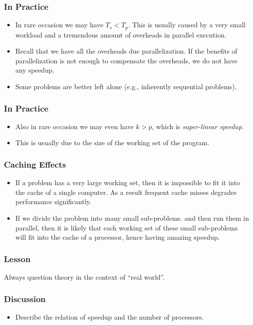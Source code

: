 \documentclass{beamer}
\begin{document}
\begin{CJK}{UTF8}{bsmi}
\begin{frame}
\frametitle{In Practice}
\begin{itemize}
\item In rare occasion we may have $T_s < T_p$.  This is usually
  caused by a very small workload and a tremendous amount of overheads in
  parallel execution.
\item Recall that we have all the overheads due parallelization.  If
  the benefits of parallelization is not enough to compensate the
  overheads, we do not have any speedup.
\item Some problems are better left alone (e.g., inherently sequential
  problems).
\end{itemize}
\end{frame}

\begin{frame}
\frametitle{In Practice}
\begin{itemize}
\item Also in rare occasion we may even have $k > p$, which is {\em
  super-linear speedup}.  
\item This is usually due to the size of the working set of the
  program.
\end{itemize}
\end{frame}

\begin{frame}
\frametitle{Caching Effects}
\begin{itemize}
\item If a problem has a very large working set, then it is impossible
  to fit it into the cache of a single computer.  As a result frequent
  cache misses degrades performance significantly.
\item If we divide the problem into many small sub-problems. and then
  run them in parallel, then it is likely that each working set of
  these small sub-problems will fit into the cache of a processor,
  hence having amazing speedup.
\end{itemize}
\end{frame}

\begin{frame}
\frametitle{Lesson} \huge Always question theory in the context of
``real world''.
\end{frame}

\begin{frame}
\frametitle{Discussion}
\begin{itemize}
\item Describe the relation of speedup and the number of processors.
\end{itemize}
\end{frame}


\end{CJK}
\end{document}
